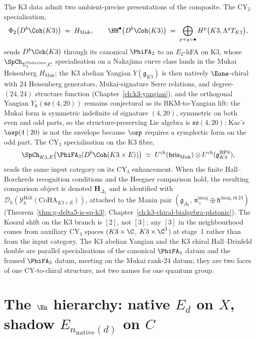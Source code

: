 The K3 data admit two ambient-precise presentations of the
composite. The CY$_2$ specialisation,
\[
 \Phi_2\bigl(D^b\Coh(K3)\bigr)
 \;=\; H_{\mathrm{Muk}},
 \qquad
 \HH^\bullet\bigl(D^b\Coh(K3)\bigr)
 \;=\; \bigoplus_{p+q=\bullet} H^p\bigl(K3, \Lambda^q T_{K3}\bigr),
\]
sends $D^b\Coh(K3)$ through its canonical $\PhiFA_2$ to an
$E_2$-hFA on K3, whose $\SpCh_{\Sigma_1^{\mathrm{Nakajima}}, C}$
specialisation on a Nakajima curve class lands in the Mukai
Heisenberg $H_{\mathrm{Muk}}$; the K3 abelian Yangian
$Y(\mathfrak{g}_{K3})$ is then natively $\Eone$-chiral with $24$
Heisenberg generators, Mukai-signature Serre relations, and
degree-$(24, 24)$ structure function
(Chapter~\ref{ch:k3-yangian}), and the orthogonal Yangian
$Y_\hbar(\mathfrak{so}(4, 20))$ remains conjectural as its
BKM-to-Yangian lift: the Mukai form is symmetric indefinite of
signature $(4, 20)$, symmetric on both even and odd parts, so the
structure-preserving Lie algebra is $\mathfrak{so}(4, 20)$; Kac's
$\osp(4 \mid 20)$ is not the envelope because $\osp$ requires a
symplectic form on the odd part.
The CY$_3$
specialisation on the K3 fibre,
\[
 \SpCh_{K3, E}\bigl(\PhiFA_3(D^b\Coh(K3\times E))\bigr)
 \;\simeq\;
 U^{\mathrm{ch}}(\mathfrak{heis}_{\mathrm{Muk}})
 \otimes
 U^{\mathrm{ch}}(\mathfrak{g}^{\mathrm{BPS}}_{K3}),
\]
reads the same input category on its CY$_3$ enhancement. When the
finite Hall--Borcherds recognition conditions and the Heegner comparison
hold, the resulting comparison object is denoted
$\mathbf{H}_{\Delta_5}$ and is identified with
$\mathcal{D}_\hbar(\mathcal{Y}^{\mathrm{Hall}}_\hbar(\mathrm{CoHA}_{K3\times E}))$,
attached to the Manin pair
$(\mathfrak{g}_{\Delta_5},\, \mathfrak{n}_+^{\mathrm{imag}}
 \oplus \mathfrak{h}^{\mathrm{imag, rk\,23}})$
(Theorem~\ref{thm:g-delta5-is-sp-k3};
Chapter~\ref{ch:k3-chiral-bialgebra-platonic}). The Koszul shift
on the K3 branch is $[2]$, not $[3]$; any $[3]$ in the
neighbourhood comes from auxiliary CY$_3$ spaces
($K3\times\C$, $K3\times\C^3$) at stage~1 rather than from the
input category. The K3 abelian Yangian and the K3 chiral
Hall--Drinfeld double are parallel specialisations of the
canonical $\PhiFA_2$ datum and the framed $\PhiFA_3$ datum, meeting on the Mukai
rank-$24$ datum; they are two faces of one CY-to-chiral structure,
not two names for one quantum group.

\section{The \texorpdfstring{$\En$}{E-n} hierarchy: native \texorpdfstring{$E_d$}{E-d} on \texorpdfstring{$X$}{X}, shadow \texorpdfstring{$E_{n_{\mathrm{native}}(d)}$}{E-n-native(d)} on \texorpdfstring{$C$}{C}}
\label{sec:e1-e2-hierarchy}

